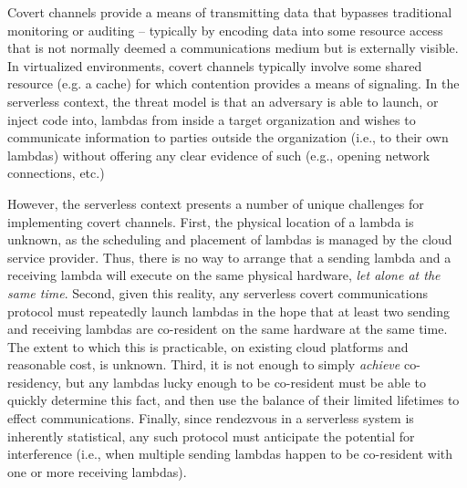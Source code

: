 Covert channels provide a means of transmitting
data that bypasses traditional monitoring or auditing -- typically by
encoding data into some resource access that is not normally deemed a
communications medium but is externally visible.  In virtualized
environments, covert channels typically involve some shared resource
(e.g. a cache) for which contention provides a means of signaling.
In the serverless context, the threat model is that an adversary is
able to launch, or inject code into, lambdas from inside a target
organization and wishes to communicate information to parties outside
the organization (i.e., to their own lambdas) without offering any
clear evidence of such (e.g., opening network connections, etc.)

However, the serverless context presents a number of unique challenges for
implementing covert channels.  First, the physical location of a lambda is 
unknown, as the scheduling and placement of lambdas is
managed by the cloud service provider.  Thus, there is no way to arrange that a
sending lambda and a receiving lambda will execute on the same physical
hardware, \emph{let alone at the same time}.  Second, given this reality, any
serverless covert communications protocol must repeatedly launch lambdas in the
hope that at least two sending and receiving lambdas are co-resident on the same
hardware at the same time.  The extent to which this is practicable, on existing
cloud platforms and reasonable cost, is unknown.  Third, it is not enough to
simply \emph{achieve} co-residency, but any lambdas lucky enough to be
co-resident must be able to quickly determine this fact, and then use the
balance of their limited lifetimes to effect communications.  Finally, since
rendezvous in a serverless system is inherently statistical, any such protocol
must anticipate the potential for interference (i.e., when multiple sending
lambdas happen to be co-resident with one or more receiving lambdas).

